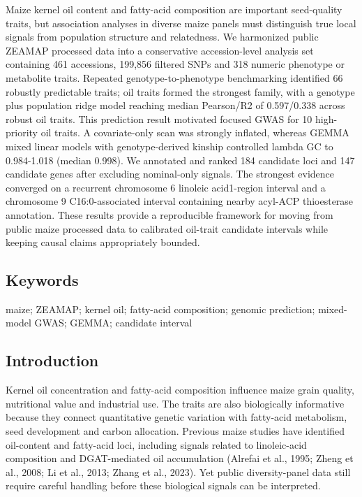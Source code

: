 \documentclass[
]{article}
\begin{document}
Maize kernel oil content and fatty-acid composition are important
seed-quality traits, but association analyses in diverse maize panels
must distinguish true local signals from population structure and
relatedness. We harmonized public ZEAMAP processed data into a
conservative accession-level analysis set containing 461 accessions,
199,856 filtered SNPs and 318 numeric phenotype or metabolite traits.
Repeated genotype-to-phenotype benchmarking identified 66 robustly
predictable traits; oil traits formed the strongest family, with a
genotype plus population ridge model reaching median Pearson/R2 of
0.597/0.338 across robust oil traits. This prediction result motivated
focused GWAS for 10 high-priority oil traits. A covariate-only scan was
strongly inflated, whereas GEMMA mixed linear models with
genotype-derived kinship controlled lambda GC to 0.984-1.018 (median
0.998). We annotated and ranked 184 candidate loci and 147 candidate
genes after excluding nominal-only signals. The strongest evidence
converged on a recurrent chromosome 6 linoleic acid1-region interval and
a chromosome 9 C16:0-associated interval containing nearby acyl-ACP
thioesterase annotation. These results provide a reproducible framework
for moving from public maize processed data to calibrated oil-trait
candidate intervals while keeping causal claims appropriately bounded.

\subsection{Keywords}\label{keywords}

maize; ZEAMAP; kernel oil; fatty-acid composition; genomic prediction;
mixed-model GWAS; GEMMA; candidate interval

\subsection{Introduction}\label{introduction}

Kernel oil concentration and fatty-acid composition influence maize
grain quality, nutritional value and industrial use. The traits are also
biologically informative because they connect quantitative genetic
variation with fatty-acid metabolism, seed development and carbon
allocation. Previous maize studies have identified oil-content and
fatty-acid loci, including signals related to linoleic-acid composition
and DGAT-mediated oil accumulation (Alrefai et al., 1995; Zheng et al.,
2008; Li et al., 2013; Zhang et al., 2023). Yet public diversity-panel
data still require careful handling before these biological signals can
be interpreted.
\end{document}
